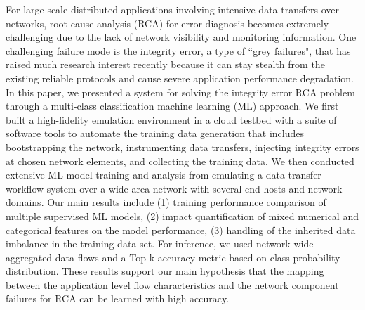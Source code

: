 For large-scale distributed applications involving intensive data transfers over networks, root cause analysis (RCA) for error diagnosis becomes extremely challenging due to the lack of network visibility and monitoring information.
One challenging failure mode is the integrity error, a type of ``grey failures", that has raised much research interest recently because it can stay stealth from the existing reliable protocols and cause severe application performance degradation.
In this paper, we presented a system for solving the integrity error RCA problem through a multi-class classification machine learning (ML) approach. We first built a high-fidelity emulation environment in a cloud testbed with a suite of software tools to automate the training data generation that includes bootstrapping the network, instrumenting data transfers, injecting integrity errors at chosen network elements, and collecting the training data. 
We then conducted extensive ML model training and analysis from emulating a data transfer workflow system over a wide-area network with several end hosts and network domains. Our main results include (1) training performance comparison of multiple supervised ML models, (2) impact quantification of mixed numerical and categorical features on the model performance, (3) handling of the inherited data imbalance in the training data set. For inference, we used network-wide aggregated data flows and a Top-k accuracy metric based on class probability distribution. These results support our main hypothesis that the mapping between the application level flow characteristics and the network component failures for RCA can be learned with high accuracy.
